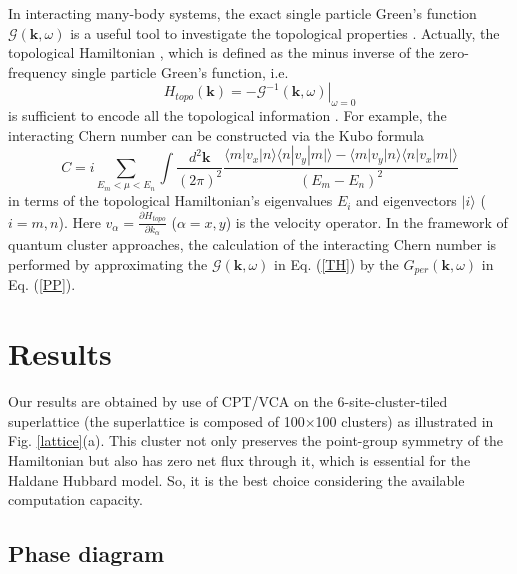 \documentclass[12pt]{iopart}
\begin{document}
\par In interacting many-body systems, the exact single particle Green's function $\mathcal{G}(\mathbf{k},\omega)$ is a useful tool to investigate the topological properties \cite{V2003,G_PRB2011,WZ_PRX2012}. Actually, the topological Hamiltonian \cite{WY_JPCM2013}, which is defined as the minus inverse of the zero-frequency single particle Green's function, i.e.
\begin{equation}\label{TH}
H_{topo}(\mathbf{k})=\left.-\mathcal{G}^{-1}(\mathbf{k},\omega)\right|_{\omega=0}
\end{equation}
is sufficient to encode all the topological information \cite{WZ_PRX2012}. For example, the interacting Chern number can be constructed via the Kubo formula \cite{TKNN_PRL1982}
\begin{equation}\label{KF}
C=i\sum_{E_m<\mu<E_n} \int\frac{d^2\mathbf{k}}{(2\pi)^2} \frac{\langle m|v_x|n\rangle\langle n|v_y|m|\rangle-\langle m|v_y|n\rangle\langle n|v_x|m|\rangle}{(E_m-E_n)^2}
\end{equation}
in terms of the topological Hamiltonian's eigenvalues $E_i$ and eigenvectors $|i\rangle$ ($i=m,n$). Here $v_\alpha=\frac{\partial H_{topo}}{\partial k_\alpha}$ ($\alpha=x,y$) is the velocity operator. In the framework of quantum cluster approaches, the calculation of the interacting Chern number is performed by approximating the $\mathcal{G}(\mathbf{k},\omega)$ in Eq. (\ref{TH}) by the $G_{per}(\mathbf{k},\omega)$ in Eq. (\ref{PP}).

\section{Results}\label{R}

\par Our results are obtained by use of CPT/VCA on the 6-site-cluster-tiled superlattice (the superlattice is composed of 100$\times$100 clusters) as illustrated in Fig. \ref{lattice}(a). This cluster not only preserves the point-group symmetry of the Hamiltonian but also has zero net flux through it, which is essential for the Haldane Hubbard model. So, it is the best choice considering the available computation capacity.

\subsection{Phase diagram}
\end{document}
